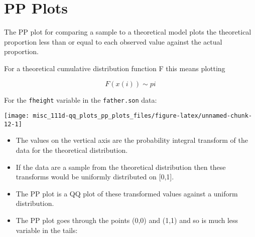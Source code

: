 \documentclass[]{book}
\newenvironment{Shaded}{\begin{snugshade}}{\end{snugshade}}
\newcommand{\DataTypeTok}[1]{\textcolor[rgb]{0.13,0.29,0.53}{#1}}
\newcommand{\DecValTok}[1]{\textcolor[rgb]{0.00,0.00,0.81}{#1}}
\newcommand{\FloatTok}[1]{\textcolor[rgb]{0.00,0.00,0.81}{#1}}
\newcommand{\KeywordTok}[1]{\textcolor[rgb]{0.13,0.29,0.53}{\textbf{#1}}}
\newcommand{\NormalTok}[1]{#1}
\newcommand{\OperatorTok}[1]{\textcolor[rgb]{0.81,0.36,0.00}{\textbf{#1}}}
\newcommand{\StringTok}[1]{\textcolor[rgb]{0.31,0.60,0.02}{#1}}
\begin{document}
\hypertarget{pp-plots}{%
\section{PP Plots}\label{pp-plots}}

The PP plot for comparing a sample to a theoretical model plots the theoretical proportion less than or equal to each observed value against the actual proportion.

For a theoretical cumulative distribution function F this means plotting

\[F(x(i))∼pi\]

For the \texttt{fheight} variable in the \texttt{father.son} data:

\begin{Shaded}
\end{Shaded}

\begin{center}\texttt{[image: misc\_111d-qq\_plots\_pp\_plots\_files/figure-latex/unnamed-chunk-12-1]} \end{center}

\begin{itemize}
\item
  The values on the vertical axis are the probability integral transform of the data for the theoretical distribution.
\item
  If the data are a sample from the theoretical distribution then these transforms would be uniformly distributed on {[}0,1{]}.
\item
  The PP plot is a QQ plot of these transformed values against a uniform distribution.
\item
  The PP plot goes through the points (0,0) and (1,1) and so is much less variable in the tails:
\end{itemize}
\end{document}
